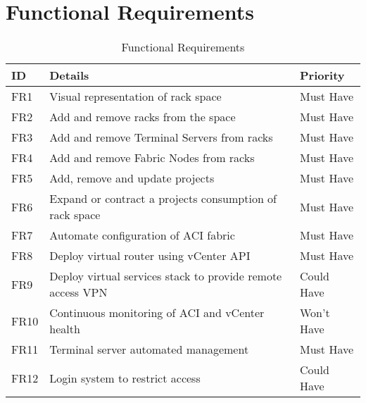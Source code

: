 \section{Functional Requirements}
\label{requirements:functional}
\begin{center}
    \begin{table}[H]
        \begin{tabular}{l l l}
            \hline
            \textbf{ID} & \textbf{Details}
                        & \textbf{Priority}
            \\ \hline
            FR1         & Visual representation of rack space
                        & Must Have
            \\ \hline
            FR2         & Add and remove racks from the space
                        & Must Have
            \\ \hline
            FR3         & Add and remove Terminal Servers from racks
                        & Must Have
            \\ \hline
            FR4         & Add and remove Fabric Nodes from racks
                        & Must Have
            \\ \hline
            FR5         & Add, remove and update projects
                        & Must Have
            \\ \hline
            FR6         & Expand or contract a projects consumption of rack
            space       & Must Have
            \\ \hline
            FR7         & Automate configuration of ACI fabric
                        & Must Have
            \\ \hline
            FR8         & Deploy virtual router using vCenter API
                        & Must Have
            \\ \hline
            FR9         & Deploy virtual services stack to provide remote
            access VPN  & Could
            Have
            \\ \hline
            FR10        & Continuous monitoring of ACI and vCenter health
                        & Won’t Have
            \\
            \hline
            FR11        & Terminal server automated management
                        & Must Have
            \\ \hline
            FR12        & Login system to restrict access                   &
            Could Have                                                        \\
        \end{tabular}
        \caption{Functional Requirements}
    \end{table}
\end{center}

